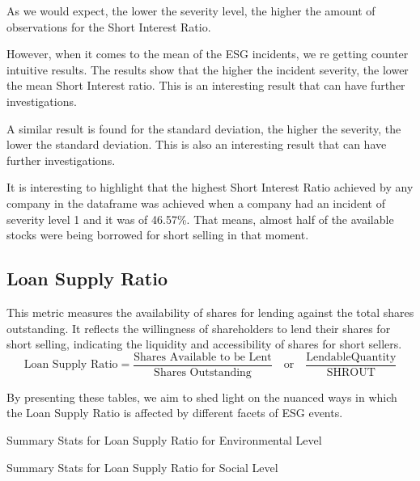 As we would expect, the lower the severity level, the higher the amount of observations for the Short Interest Ratio.

However, when it comes to the mean of the ESG incidents, we re getting counter intuitive results. The results show that the higher the incident severity, the lower the mean Short Interest ratio. This is an interesting result that can have further investigations.

A similar result is found for the standard deviation, the higher the severity, the lower the standard deviation. This is also an interesting result that can have further investigations.

It is interesting to highlight that the highest Short Interest Ratio achieved by any company in the dataframe was achieved when a company had an incident of severity level 1 and it was of 46.57\%. That means, almost half of the available stocks were being borrowed for short selling in that moment.


\subsection{Loan Supply Ratio}


This metric measures the availability of shares for lending against the total shares outstanding. It reflects the willingness of shareholders to lend their shares for short selling, indicating the liquidity and accessibility of shares for short sellers.
 \begin{equation}
	\text{Loan Supply Ratio} = \frac{\text{Shares Available to be Lent}}{\text{Shares Outstanding}} \quad \text{or} \quad \frac{\text{LendableQuantity}}{\text{SHROUT}}
	\label{eq:Loan_Supply_Ratio}
\end{equation}

By presenting these tables, we aim to shed light on the nuanced ways in which the Loan Supply Ratio is affected by different facets of ESG events.

\begin{table}[H]
\caption{Summary Stats for Loan Supply Ratio for Environmental Level}
\centering

\label{table:loan_supply_ratio_environment.tex}
\end{table}

\begin{table}[H]
\caption{Summary Stats for Loan Supply Ratio for Social Level}
\centering

\label{table:loan_supply_ratio_social.tex}
\end{table}

